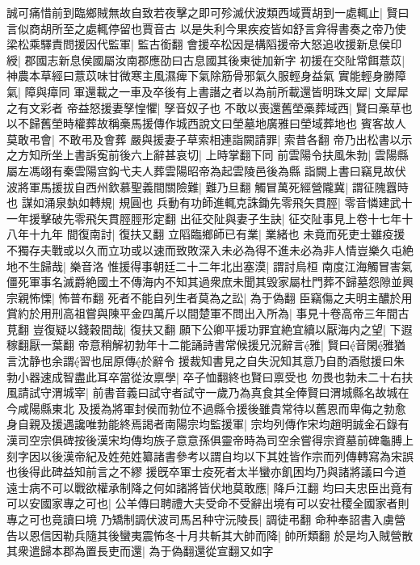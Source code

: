 誠可痛惜前到臨鄉賊無故自致若夜擊之即可殄滅伏波類西域賈胡到一處輒止|{
	賢曰言似商胡所至之處輒停留也賈音古}
以是失利今果疾疫皆如舒言弇得書奏之帝乃使梁松乘驛責問援因代監軍|{
	監古銜翻}
會援卒松因是構䧟援帝大怒追收援新息侯印綬|{
	郡國志新息侯國屬汝南郡應劭曰古息國其後東徙加新字}
初援在交阯常餌薏苡|{
	神農本草經曰薏苡味甘微寒主風濕痺下氣除筋骨邪氣久服輕身益氣}
實能輕身勝障氣|{
	障與瘴同}
軍還載之一車及卒後有上書譖之者以為前所載還皆明珠文犀|{
	文犀犀之有文彩者}
帝益怒援妻孥惶懼|{
	孥音奴子也}
不敢以喪還舊塋槀葬域西|{
	賢曰槀草也以不歸舊塋時權葬故稱槀馬援傳作城西說文曰塋墓地廣雅曰塋域葬地也}
賓客故人莫敢弔會|{
	不敢弔及會葬}
嚴與援妻子草索相連詣闕請罪|{
	索昔各翻}
帝乃出松書以示之方知所坐上書訴寃前後六上辭甚哀切|{
	上時掌翻下同}
前雲陽令扶風朱勃|{
	雲陽縣屬左馮翊有秦雲陽宫鈎弋夫人葬雲陽昭帝為起雲陵邑後為縣}
詣闕上書曰竊見故伏波將軍馬援拔自西州欽慕聖義間關險難|{
	難乃旦翻}
觸冒萬死經營隴冀|{
	謂征隗囂時也}
謀如涌泉埶如轉規|{
	規圓也}
兵動有功師進輒克誅鋤先零飛矢貫脛|{
	零音憐建武十一年援擊破先零飛矢貫脛脛形定翻}
出征交阯與妻子生訣|{
	征交阯事見上卷十七年十八年十九年}
間復南討|{
	復扶又翻}
立䧟臨鄉師已有業|{
	業緒也}
未竟而死吏士雖疫援不獨存夫戰或以久而立功或以速而致敗深入未必為得不進未必為非人情豈樂久屯絶地不生歸哉|{
	樂音洛}
惟援得事朝廷二十二年北出塞漠|{
	謂討烏桓}
南度江海觸冒害氣僵死軍事名滅爵絶國土不傳海内不知其過衆庶未聞其毁家屬杜門葬不歸墓怨隙並興宗親怖慄|{
	怖普布翻}
死者不能自列生者莫為之訟|{
	為于偽翻}
臣竊傷之夫明主醲於用賞約於用刑高祖嘗與陳平金四萬斤以間楚軍不問出入所為|{
	事見十卷高帝三年間古莧翻}
豈復疑以錢穀間哉|{
	復扶又翻}
願下公卿平援功罪宜絶宜續以厭海内之望|{
	下遐稼翻厭一葉翻}
帝意稍解初勃年十二能誦詩書常候援兄況辭言雅|{
	賢曰音閑雅猶言沈静也余謂習也屈原傳於辭令}
援裁知書見之自失況知其意乃自酌酒慰援曰朱勃小器速成智盡此耳卒當從汝禀學|{
	卒子恤翻終也賢曰禀受也}
勿畏也勃未二十右扶風請試守渭城宰|{
	前書音義曰試守者試守一歲乃為真食其全俸賢曰渭城縣名故城在今咸陽縣東北}
及援為將軍封侯而勃位不過縣令援後雖貴常待以舊恩而卑侮之勃愈身自親及援遇讒唯勃能終焉謁者南陽宗均監援軍|{
	宗均列傳作宋均趙明誠金石錄有漢司空宗俱碑按後漢宋均傳均族子意意孫俱靈帝時為司空余嘗得宗資墓前碑龜膊上刻字因以後漢帝紀及姓苑姓纂諸書參考以謂自均以下其姓皆作宗而列傳轉寫為宋誤也後得此碑益知前言之不繆}
援旣卒軍士疫死者太半蠻亦飢困均乃與諸將議曰今道遠士病不可以戰欲權承制降之何如諸將皆伏地莫敢應|{
	降戶江翻}
均曰夫忠臣出竟有可以安國家專之可也|{
	公羊傳曰聘禮大夫受命不受辭出境有可以安社稷全國家者則專之可也竟讀曰境}
乃矯制調伏波司馬呂种守沅陵長|{
	調徒弔翻}
命种奉詔書入虜營告以恩信因勒兵隨其後蠻夷震怖冬十月共斬其大帥而降|{
	帥所類翻}
於是均入賊營散其衆遣歸本郡為置長吏而還|{
	為于偽翻還從宣翻又如字}
